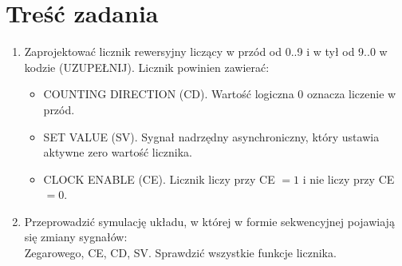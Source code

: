 \section*{Treść zadania}
\begin{enumerate}
    \item Zaprojektować licznik rewersyjny liczący w przód od 0..9 i w tył od 9..0 w kodzie (UZUPEŁNIJ). Licznik powinien zawierać:
    \begin{itemize}
        \item COUNTING DIRECTION (CD). Wartość logiczna 0 oznacza liczenie w przód.
        \item SET VALUE (SV). Sygnał nadrzędny asynchroniczny, który ustawia aktywne zero wartość licznika.
        \item CLOCK ENABLE (CE). Licznik liczy przy CE $ = 1$ i nie liczy przy CE $= 0$.
    \end{itemize}
    \item Przeprowadzić symulację układu, w której w formie sekwencyjnej pojawiają się zmiany sygnałów: \\
    Zegarowego, CE, CD, SV. Sprawdzić wszystkie funkcje licznika.
    
\end{enumerate}
